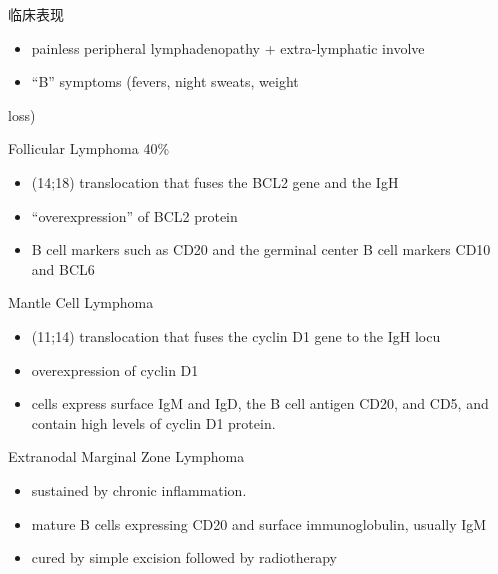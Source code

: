 \documentclass[
  ignorenonframetext,
]{beamer}
\begin{document}
\begin{frame}
\begin{block}{临床表现}
\protect\hypertarget{ux4e34ux5e8aux8868ux73b0-9}{}
\begin{itemize}
\item
  painless peripheral lymphadenopathy + extra-lymphatic involve
\item
  ``B'' symptoms (fevers, night sweats, weight
\end{itemize}

loss)
\end{block}
\end{frame}

\begin{frame}
\begin{block}{Follicular Lymphoma 40\%}
\protect\hypertarget{follicular-lymphoma-40}{}
\begin{itemize}
\item
  (14;18) translocation that fuses the BCL2 gene and the IgH
\item
  ``overexpression'' of BCL2 protein
\item
  B cell markers such as CD20 and the germinal center B cell markers
  CD10 and BCL6
\end{itemize}
\end{block}
\end{frame}

\begin{frame}
\begin{block}{Mantle Cell Lymphoma}
\protect\hypertarget{mantle-cell-lymphoma}{}
\begin{itemize}
\item
  (11;14) translocation that fuses the cyclin D1 gene to the IgH locu
\item
  overexpression of cyclin D1
\item
  cells express surface IgM and IgD, the B cell antigen CD20, and CD5,
  and contain high levels of cyclin D1 protein.
\end{itemize}
\end{block}
\end{frame}

\begin{frame}
\begin{block}{Extranodal Marginal Zone Lymphoma}
\protect\hypertarget{extranodal-marginal-zone-lymphoma}{}
\begin{itemize}
\item
  sustained by chronic inflammation.
\item
  mature B cells expressing CD20 and surface immunoglobulin, usually IgM
\item
  cured by simple excision followed by radiotherapy
\end{itemize}
\end{block}
\end{frame}
\end{document}
